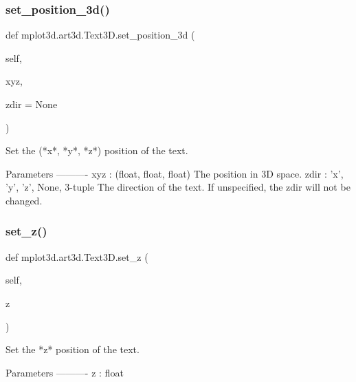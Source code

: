 \mbox{\label{classmplot3d_1_1art3d_1_1Text3D_a29de8f88d145d3dbe79082b5d952f7f8}} 
\subsubsection{\texorpdfstring{set\+\_\+position\+\_\+3d()}{set\_position\_3d()}}
{\footnotesize\ttfamily def mplot3d.\+art3d.\+Text3\+D.\+set\+\_\+position\+\_\+3d (\begin{DoxyParamCaption}\item[{}]{self,  }\item[{}]{xyz,  }\item[{}]{zdir = {\ttfamily None} }\end{DoxyParamCaption})}

\begin{DoxyVerb}Set the (*x*, *y*, *z*) position of the text.

Parameters
----------
xyz : (float, float, float)
    The position in 3D space.
zdir : {'x', 'y', 'z', None, 3-tuple}
    The direction of the text. If unspecified, the zdir will not be
    changed.
\end{DoxyVerb}
 \mbox{\label{classmplot3d_1_1art3d_1_1Text3D_ac534caebaf8ecd50fdddc91243ea0beb}} 
\subsubsection{\texorpdfstring{set\+\_\+z()}{set\_z()}}
{\footnotesize\ttfamily def mplot3d.\+art3d.\+Text3\+D.\+set\+\_\+z (\begin{DoxyParamCaption}\item[{}]{self,  }\item[{}]{z }\end{DoxyParamCaption})}

\begin{DoxyVerb}Set the *z* position of the text.

Parameters
----------
z : float
\end{DoxyVerb}
 

